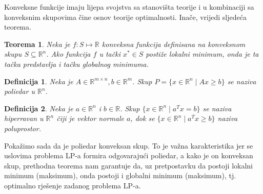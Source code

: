 \documentclass[a4paper, utf8, 11pt, colorlinks]{book}
\newtheorem{definition}{Definicija}
\newtheorem{thm}{Teorema}
\newenvironment{proof}{{Dokaz:}}{\hfill$\square$}
\begin{document}
Konveksne funkcije imaju lijepa svojstva sa stanovišta teorije i u kombinaciji sa konveksnim skupovima čine osnov  teorije optimalnosti. Inače, vrijedi sljedeća teorema.
\begin{thm}
  Neka je $f : S \mapsto \mathbb{R}$ konveksna funkcija definisana na konveksnom skupu $S \subseteq \mathbb{R}^n$. Ako funkcija $f$ u tački $x^* \in S$
 postiže lokalni minimum, onda je ta tačka predstavlja i tačku globalnog minimuma.
\end{thm}

\begin{definition}
   Neka je $A \in \mathbb{R}^{m \times n}, b \in \mathbb{R}^m$. Skup $P=\{x \in \mathbb{R}^n \mid Ax \geq b\}$ se naziva poliedar u $\mathbb{R}^n$. 
\end{definition}
\begin{definition}
   Neka je $a\in \mathbb{R}^n $ i $b \in \mathbb{R}$. Skup $\{ x \in \mathbb{R}^n \mid a^T x = b \}$ se naziva hiperravan u $\mathbb{R}^n$ čiji je vektor  normale $a$, dok se $\{ x \in \mathbb{R}^n \mid a^T x \geq b \}$ naziva poluprostor. 
\end{definition}
Pokažimo sada da je poliedar konveksan skup. To je važna karakteristika jer se uslovima problema LP-a formira odgovarajući poliedar, a kako je on konveksan skup, prethodna teorema nam garantuje da, uz pretpostavku da postoji lokalni minimum (maksimum), onda postoji  i globalni minimum (maksimum), tj. optimalno rješenje zadanog problema LP-a.
\end{document}
